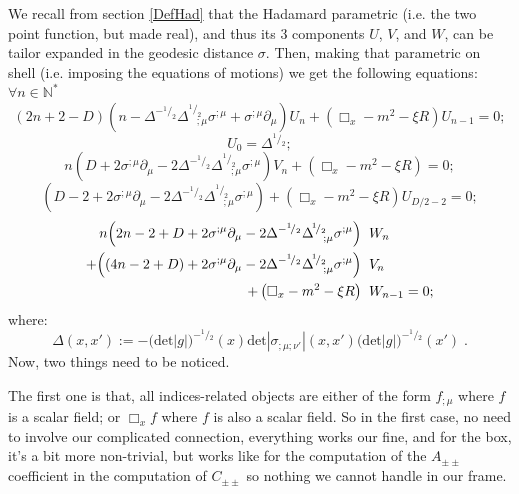 \documentclass[a4paper,11pt]{article}
\numberwithin{equation}{section}
\theoremstyle{definition}
\begin{document}
We recall from section \ref{DefHad} that the Hadamard parametric (i.e. the two point function, but made real), and thus its 3 components $U$, $V$, and $W$,  can be tailor expanded in the geodesic distance $\sigma$. Then, making that parametric on shell (i.e. imposing the equations of motions) we get the following equations:\\
$\forall n \in \mathbb{N}^*$
\begin{equation}
    (2n+2-D) \left( n - \Delta^{-^1\!/_2} \Delta^{\!^1\!/_2}_{\;\;\; ;\mu} \sigma^{;\mu} + \sigma^{;\mu}\partial_\mu \right) U_n + \left(\Box_x -m^2 - \xi R\right) U_{n-1} = 0;
\end{equation}
\begin{equation}
    U_0=\Delta^{\!^1\!/_2};
\end{equation}
\begin{equation}
    n \left(D + 2 \sigma^{;\mu}\partial_\mu -  2 \Delta^{-^1\!/_2} \Delta^{\!^1\!/_2}_{\;\;\; ;\mu} \sigma^{;\mu}\right) V_n + \left( \Box_x - m^2 - \xi R\right)=0;
\end{equation}
\begin{equation}
    \left( D-2 + 2 \sigma^{;\mu} \partial_\mu - 2 \Delta^{-^1\!/_2} \Delta^{\!^1\!/_2}_{\;\;\; ;\mu}\sigma^{;\mu} \right) + \left( \Box_x - m^2 - \xi R\right) U_{D/2 - 2} = 0;
\end{equation}
\begin{align}
     n \Big(2n -2 + D + 2 \sigma^{;\mu} \partial_\mu - 2 \Delta^{-^1\!/_2} \Delta^{\!^1\!/_2}_{\;\;\; ;\mu}\sigma^{;\mu}\Big) \;&\; W_n\notag\\
+ \Big((4 n -2 + D) + 2 \sigma^{;\mu} \partial_\mu - 2 \Delta^{-^1\!/_2} \Delta^{\!^1\!/_2}_{\;\;\; ;\mu}\sigma^{;\mu} \Big) \;&\; V_n \\ + \left( \Box_x -m^2 - \xi R\right) \;&\; W_{n-1} = 0 \notag ;
\end{align}
where:
\begin{equation}
    \boxed{\Delta(x,x') := - \big(\mathrm{det}|g|\big)^{-^1\!/\!_2}(x) \mathrm{det}|\sigma_{;\mu ;\nu'}|(x,x')\big(\mathrm{det}|g|\big)^{-^1\!/\!_2}(x')}\;.
\end{equation}
Now, two things need to be noticed.

The first one is that, all indices-related objects are either of the form $f_{;\mu}$ where $f$ is a scalar field; or $\Box_x f$ where $f$ is also a scalar field. So in the first case, no need to involve our complicated connection, everything works our fine, and for the box, it's a bit more non-trivial, but works like for the computation of the $A_{\pm\pm}$ coefficient in the computation of $C_{\pm\pm}$ so nothing we cannot handle in our frame.
\end{document}
